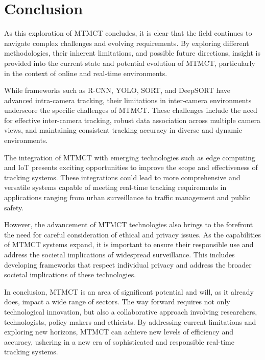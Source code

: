 \chapter{Conclusion}\label{chap:conclusion}
As this exploration of MTMCT concludes, it is clear that the field continues to navigate complex challenges and evolving requirements. By exploring different methodologies, their inherent limitations, and possible future directions, insight is provided into the current state and potential evolution of MTMCT, particularly in the context of online and real-time environments.

While frameworks such as R-CNN, YOLO, SORT, and DeepSORT have advanced intra-camera tracking, their limitations in inter-camera environments underscore the specific challenges of MTMCT. These challenges include the need for effective inter-camera tracking, robust data association across multiple camera views, and maintaining consistent tracking accuracy in diverse and dynamic environments.

The integration of MTMCT with emerging technologies such as edge computing and IoT presents exciting opportunities to improve the scope and effectiveness of tracking systems. These integrations could lead to more comprehensive and versatile systems capable of meeting real-time tracking requirements in applications ranging from urban surveillance to traffic management and public safety.

However, the advancement of MTMCT technologies also brings to the forefront the need for careful consideration of ethical and privacy issues. As the capabilities of MTMCT systems expand, it is important to ensure their responsible use and address the societal implications of widespread surveillance. This includes developing frameworks that respect individual privacy and address the broader societal implications of these technologies.

In conclusion, MTMCT is an area of significant potential and will, as it already does, impact a wide range of sectors. The way forward requires not only technological innovation, but also a collaborative approach involving researchers, technologists, policy makers and ethicists. By addressing current limitations and exploring new horizons, MTMCT can achieve new levels of efficiency and accuracy, ushering in a new era of sophisticated and responsible real-time tracking systems.